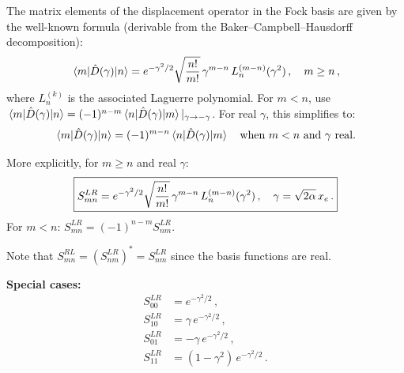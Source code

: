 The matrix elements of the displacement operator in the Fock basis are given by the
well-known formula (derivable from the Baker--Campbell--Hausdorff decomposition):
\begin{equation}\label{eq:displacement_matrix}
  \mel{m}{\hat{D}(\gamma)}{n} = e^{-\gamma^2/2}\sqrt{\frac{n!}{m!}}\,\gamma^{m-n}\,L_n^{(m-n)}(\gamma^2)\,,
  \quad m \geq n\,,
\end{equation}
where $L_n^{(k)}$ is the associated Laguerre polynomial. For $m < n$, use
$\mel{m}{\hat{D}(\gamma)}{n} = (-1)^{n-m}\mel{n}{\hat{D}(\gamma)}{m}|_{\gamma\to -\gamma}$.
For real $\gamma$, this simplifies to:
\begin{equation}
  \mel{m}{\hat{D}(\gamma)}{n} = (-1)^{m-n}\mel{n}{\hat{D}(\gamma)}{m}\quad\text{when }m < n\text{ and }\gamma \text{ real}.
\end{equation}

More explicitly, for $m \geq n$ and real $\gamma$:
\begin{equation}\label{eq:S_LR}
  \boxed{S_{mn}^{LR} = e^{-\gamma^2/2}\sqrt{\frac{n!}{m!}}\,\gamma^{m-n}\,L_n^{(m-n)}(\gamma^2)\,,
  \quad \gamma = \sqrt{2\alpha}\,x_e\,.}
\end{equation}
For $m < n$: $S_{mn}^{LR} = (-1)^{n-m}S_{nm}^{LR}$.

Note that $S_{mn}^{RL} = (S_{nm}^{LR})^*= S_{nm}^{LR}$ since the basis functions are real.

\textbf{Special cases:}
\begin{align}
  S_{00}^{LR} &= e^{-\gamma^2/2}\,,\\
  S_{10}^{LR} &= \gamma\,e^{-\gamma^2/2}\,,\\
  S_{01}^{LR} &= -\gamma\,e^{-\gamma^2/2}\,,\\
  S_{11}^{LR} &= (1-\gamma^2)\,e^{-\gamma^2/2}\,.
\end{align}

